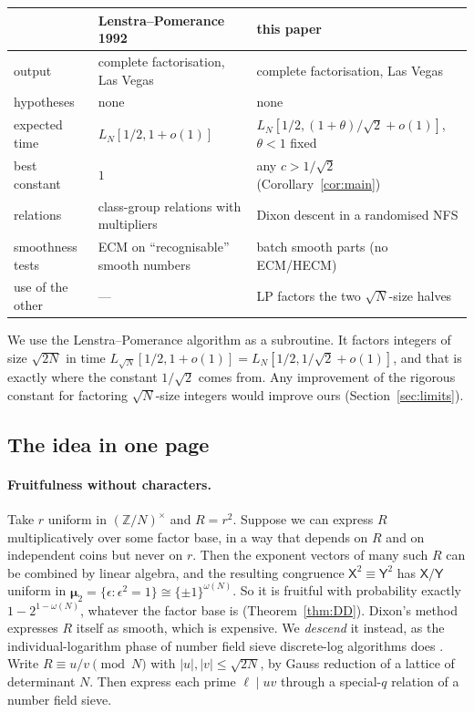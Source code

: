 \documentclass[11pt]{amsart}
\theoremstyle{definition}
\newcommand{\Z}{\mathbb{Z}}
\newcommand{\sX}{\mathsf{X}}
\newcommand{\sY}{\mathsf{Y}}
\newcommand{\bmu}{\boldsymbol{\mu}_2}
\begin{document}
\begin{center}\small
\begin{tabular}{@{}p{}p{}p{}@{}}
\toprule
& Lenstra--Pomerance 1992 \cite{lp1992} & this paper\\
\midrule
output & complete factorisation, Las Vegas & complete factorisation, Las Vegas\\
hypotheses & none & none\\
expected time & $L_N[1/2,1+o(1)]$ & $L_N[1/2,(1+\theta)/\sqrt2+o(1)]$, $\theta<1$ fixed\\
best constant & $1$ & any $c>1/\sqrt2$ (Corollary~\ref{cor:main})\\
relations & class-group relations with multipliers & Dixon descent in a randomised NFS\\
smoothness tests & ECM on ``recognisable'' smooth numbers & batch smooth parts (no ECM/HECM)\\
use of the other & --- & LP factors the two $\sqrt N$-size halves\\
\bottomrule
\end{tabular}
\end{center}

\noindent We use the Lenstra--Pomerance algorithm as a subroutine. It factors integers of size $\sqrt{2N}$
in time $L_{\sqrt N}[1/2,1+o(1)]=L_N[1/2,1/\sqrt2+o(1)]$, and that is exactly where the constant $1/\sqrt2$
comes from. Any improvement of the rigorous constant for factoring $\sqrt N$-size integers would
improve ours (Section~\ref{sec:limits}).

\subsection{The idea in one page}\label{sec:idea}

\paragraph{Fruitfulness without characters.} Take $r$ uniform in $(\Z/N)^\times$ and $R=r^2$. Suppose we can
express $R$ multiplicatively over some factor base, in a way that depends on $R$ and on independent coins
but never on $r$. Then the exponent vectors of many such $R$ can be combined by linear algebra, and the
resulting congruence $\sX^2\equiv\sY^2$ has $\sX/\sY$ uniform in $\bmu=\{\epsilon:\epsilon^2=1\}\cong\{\pm1\}^{\omega(N)}$. So
it is fruitful with probability exactly $1-2^{1-\omega(N)}$, whatever the factor base is
(Theorem~\ref{thm:DD}). Dixon's method expresses $R$ itself as smooth, which is expensive. We
\emph{descend} it instead, as the individual-logarithm phase of number field sieve discrete-log
algorithms does \cite{gordon1993,jouxlercier2003,commeinesemaev2006}. Write $R\equiv u/v\pmod N$ with $|u|,|v|\le\sqrt{2N}$, by
Gauss reduction of a lattice of determinant $N$. Then express each prime $\ell\mid uv$ through a
special-$q$ relation of a number field sieve.
\end{document}
